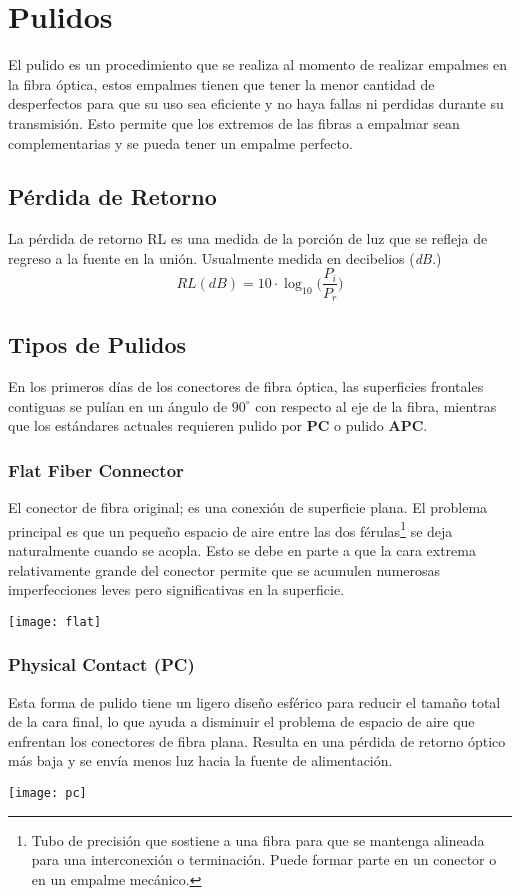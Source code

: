 \section{Pulidos}
El pulido es un procedimiento que se realiza al momento de realizar empalmes en la fibra óptica, estos empalmes tienen que tener la menor cantidad de desperfectos para que su uso sea eficiente y no haya fallas ni perdidas durante su transmisión. Esto permite que los extremos de las fibras a empalmar sean complementarias y se pueda tener un empalme perfecto.
\subsection{Pérdida de Retorno}
La pérdida de retorno RL es una medida de la porción de luz que se refleja de regreso a la fuente en la unión. Usualmente medida en decibelios (\textit{dB.})
$$
RL(dB)= 10\cdot \log_{10} \Bigg(\dfrac{P_i}{P_r}\Bigg)
$$
\subsection{Tipos de Pulidos}
En los primeros días de los conectores de fibra óptica, las superficies frontales contiguas se pulían en un ángulo de $90^{\circ}$ con respecto al eje de la fibra, mientras que los estándares actuales requieren pulido por \textbf{PC} o pulido \textbf{APC}.

\subsubsection*{Flat Fiber Connector}
El conector de fibra original; es una conexión de superficie plana. El problema principal es que un pequeño espacio de aire entre las dos férulas\footnote{Tubo de precisión que sostiene a una fibra para que se mantenga alineada para una interconexión o terminación. Puede formar parte en un conector o en un empalme mecánico.} se deja naturalmente cuando se acopla. Esto se debe en parte a que la cara extrema relativamente grande del conector permite que se acumulen numerosas imperfecciones leves pero significativas en la superficie.
\begin{center}
\texttt{[image: flat]}
\end{center}
\subsubsection*{Physical Contact (PC)}
Esta forma de pulido tiene un ligero diseño esférico para reducir el tamaño total de la cara final, lo que ayuda a disminuir el problema de espacio de aire que enfrentan los conectores de fibra plana. Resulta en una pérdida de retorno óptico más baja y se envía menos luz hacia la fuente de alimentación.
\begin{center}
\texttt{[image: pc]}
\end{center}
